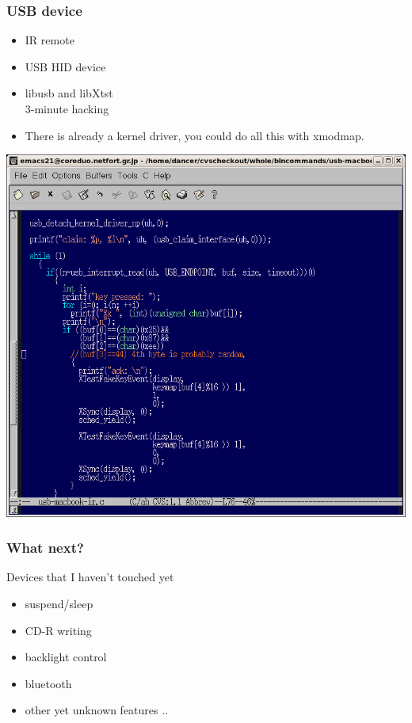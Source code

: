 \documentclass[cjk,dvipdfm]{beamer}
\begin{document}
\begin{frame}
 \frametitle{USB device}

\begin{minipage}[t]{0.4\hsize}
  \begin{itemize}
  \item<1-> IR remote
  \item<1-> USB HID device
  \item<2-> libusb and libXtst\\
       3-minute hacking
  \item<3-> There is already a kernel driver, you could do all this with
       xmodmap.
 \end{itemize}
\end{minipage}
\begin{minipage}[t]{0.5\hsize}
 \includegraphics[width=2\hsize]{image200607/usbir.png}
\end{minipage}
\end{frame}



\begin{frame}
\frametitle{What next?}
Devices that I haven't touched yet
\begin{itemize}
 \item suspend/sleep
 \item CD-R writing
 \item backlight control
 \item bluetooth
 \item other yet unknown features ..
\end{itemize}
\end{frame}
\end{document}
